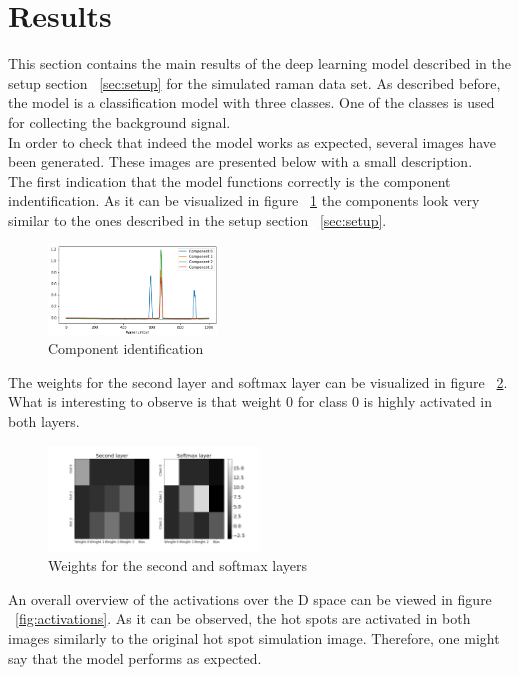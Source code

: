 \documentclass{article}
\begin{document}
\section{Results}
\label{sec:results}
This section contains the main results of the deep learning model described in the setup section ~\ref{sec:setup} for the simulated raman data set.
As described before, the model is a classification model with three classes. One of the classes is used for collecting the background signal.\\ In order to check that indeed the model works as expected, several images have been generated. These images are presented below with a small description.\\ 
The first indication that the model functions correctly is the component indentification. As it can be visualized in figure ~\ref{fig:components} the components look very similar to the ones described in the setup section ~\ref{sec:setup}.\\
\begin{figure}[!h]
	\centering
	\includegraphics[width=0.4\textwidth]{figures_3/raman_sim_3_encode_layer_1_finetune_13.png}
	\caption{Component identification}
	\label{fig:components}
\end{figure}
The weights for the second layer and softmax layer can be visualized in figure ~\ref{fig:weights}. What is interesting to observe is that weight 0 for class 0 is highly activated in both layers.\\ 
\begin{figure}[!h]
  \includegraphics[width=0.5\textwidth]{figures_2/raman_sim_second_softmax_encode.png}
  \caption{Weights for the second and softmax layers}
  \label{fig:weights}
\end{figure}
An overall overview of the activations over the D space can be viewed in figure ~\ref{fig:activations}. As it can be observed, the hot spots are activated in both images similarly to the original hot spot simulation image. Therefore, one might say that the model performs as expected.
\end{document}
